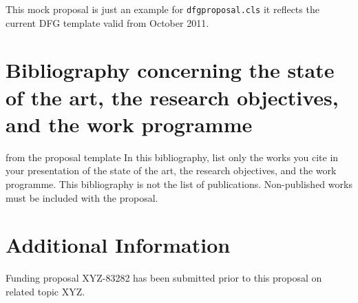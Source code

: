 \documentclass[%
    gitinfo,       %
    noworkareas,   %
    RAM,           %
    general,       %
    \classoptions] %
    {dfgproposal}
\begin{document}
\begin{center}\color{red}\huge
  This mock proposal is just an example for \texttt{dfgproposal.cls} it reflects the 
  current DFG template valid from October 2011.
\end{center}

\begin{proposal}[
  PI=miko,
  mikoname=Michael Kohlhase,
  mikoaffiliation=FAU Erlangen N\"urnberg,
  mikodept=Computer Science,
  mikotitle=Prof. Dr., 
  pubspage=mikopubs,
  thema=Intelligentes Schreiben von Antr\"agen,
  acronym={iPoWr},
  acrolong={\underline{I}ntelligent} {\underline{P}r\underline{o}posal} {\underline{Wr}iting},
  title=\pn: \protect\pnlong,
  totalduration=3 years,
  start=1. Feb. 2010,
  months=24,
  RM=36,RAM=36,
  discipline=Computer Science, 
  areas=Knowledge Management,
  keywords={LaTeX Active Documents}]






\section{Bibliography concerning the state of the art, the research objectives, and the
  work programme}

\begin{todo}{from the proposal template}
  In this bibliography, list only the works you cite in your presentation of the state of
  the art, the research objectives, and the work programme. This bibliography is not the
  list of publications. Non-published works must be included with the proposal.
\end{todo}
\printbibliography[heading=empty]
\ifpublic\else



\section{Additional Information}

Funding proposal XYZ-83282 has been submitted prior to this proposal on related topic XYZ.
\fi %
\end{proposal}
\end{document}
